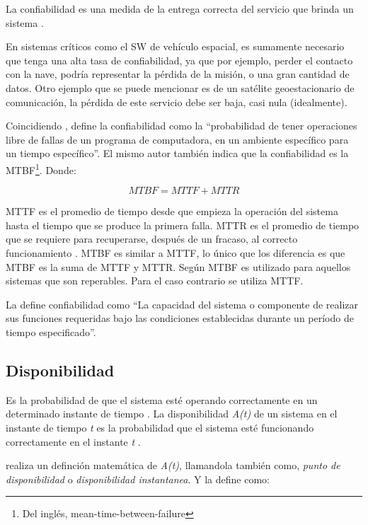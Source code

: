 La confiabilidad es una medida de la entrega correcta del servicio que brinda un sistema 
\citep{FTDesign}.

En sistemas críticos como el \ac{SW} de vehículo espacial, es sumamente necesario que tenga una 
alta tasa de confiabilidad, ya que por ejemplo, perder el contacto con la nave, podría representar 
la pérdida de la misión, o una gran cantidad de datos. Otro ejemplo que se puede mencionar es de un 
satélite geoestacionario de comunicación, la pérdida de este servicio debe ser baja, casi nula 
(idealmente). 

Coincidiendo \cite{pressman01}, define la confiabilidad como la ``probabilidad de tener operaciones 
libre de fallas de un programa de computadora, en un ambiente específico para un tiempo 
específico''. El mismo autor también indica que la confiabilidad es la \ac{MTBF}\footnote{Del 
inglés, mean-time-between-failure}. Donde:

$$MTBF = MTTF + MTTR$$

\ac{MTTF} es el promedio de tiempo desde que empieza la operación del sistema hasta el tiempo que 
se produce la primera falla. \ac{MTTR} es el promedio de tiempo que se requiere para recuperarse, 
después de un fracaso, al correcto funcionamiento \citep{Hanmer07}. \ac{MTBF}  es similar a 
\ac{MTTF}, lo único que los diferencia es que \ac{MTBF} es la suma de \ac{MTTF} y \ac{MTTR}. Según 
\cite{Hanmer07} \ac{MTBF} es utilizado para aquellos sistemas que son reperables. Para el caso 
contrario se utiliza \ac{MTTF}. 

La \cite{IEEE610.12} define confiabilidad como ``La capacidad del sistema o componente de realizar 
sus funciones requeridas bajo las condiciones establecidas durante un período de tiempo 
especificado''. 

\subsection{Disponibilidad}
Es la probabilidad de que el sistema esté operando correctamente en un determinado instante de 
tiempo \citep{SoftwareFaultToleranceATutorial}. La disponibilidad \textit{A(t)} de un sistema en el 
instante de tiempo \textit{t} es la probabilidad que el sistema esté funcionando correctamente en 
el instante \textit{t} \citep{FTDesign}. 

\cite{FTDesign} realiza un definción matemática de \textit{A(t)}, llamandola también como, 
\textit{punto de disponibilidad} o \textit{disponibilidad instantanea}. Y la define como:

